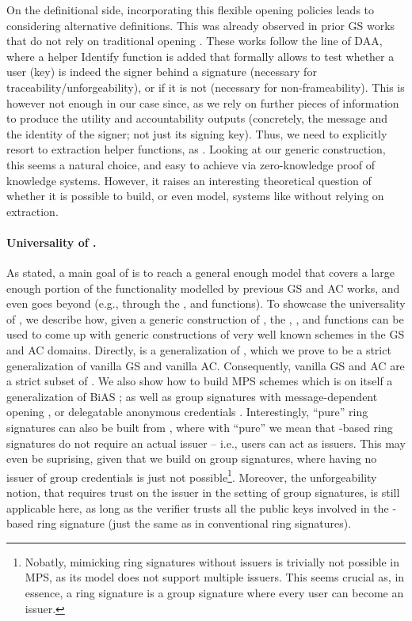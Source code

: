 On the definitional side, incorporating this flexible opening policies leads to
considering alternative definitions. This was already observed in prior GS works
that do not rely on traditional opening \cite{gl19,dl21,fgl21}. These works
follow the line of DAA, where a helper Identify function is added that formally
allows to test whether a user (key) is indeed the signer behind a signature
(necessary for traceability/unforgeability), or if it is not (necessary for
non-frameability). This is however not enough in our case since, as we rely on
further pieces of information to produce the utility and accountability outputs
(concretely, the message and the identity of the signer; not just its signing
key). Thus, we need to explicitly resort to extraction helper functions, as
\cite{lnpy21}. Looking at our generic construction, this seems a natural choice,
and easy to achieve via zero-knowledge proof of knowledge systems. However, it
raises an interesting theoretical question of whether it is possible to
build, or even model, systems like \UAS without relying on extraction.

\paragraph{Universality of \UAS.} %
As stated, a main goal of \UAS is to reach a general enough model that covers a
large enough portion of the functionality modelled by previous GS and AC works,
and even goes beyond (e.g., through the \fissue, \feval and \finsp functions).
To showcase the universality of \UAS, we describe how, given a generic
construction of \UAS, the \fissue, \feval, and \finsp functions can be used to
come up with generic constructions of very well known schemes in the GS and AC
domains. Directly, \UAS is a generalization of \GSAC, which we prove to be a
strict generalization of vanilla GS and vanilla AC. Consequently, vanilla GS and
AC are a strict subset of \UAS. We also show how to build MPS schemes \needcite
which is on itself a generalization of BiAS \cite{lnpy21}; as well as group
signatures with message-dependent opening \cite{ehk+19}, or delegatable
anonymous credentials \needcite.
%
Interestingly, ``pure'' ring signatures \cite{rst06} can also be built from
\UAS, where with ``pure'' we mean that \UAS-based ring signatures do not require
an actual issuer -- i.e., users can act as issuers. This may even be suprising,
given that we build on
group signatures, where having no issuer of group credentials is just not
possible\footnote{Nobatly, mimicking ring signatures without issuers is
  trivially not possible in MPS, as its model does not support multiple
  issuers. This seems crucial as, in essence, a ring signature is a group
  signature where every user can become an issuer.}. Moreover, the
unforgeability notion, that requires trust on the issuer in the setting of group
signatures, is still applicable here, as long as the verifier trusts all
the public keys involved in the \UAS-based ring signature (just the same
as in conventional ring signatures). 

